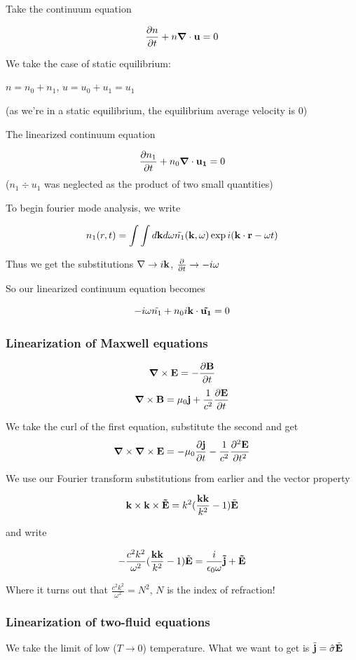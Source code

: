 \documentclass[PlasmaNotes.tex]{subfiles}
\begin{document}
Take the continuum equation

\[\frac{\partial n}{\partial t} + n\mbox{\boldmath$ \nabla $} \cdot \mathbf{u}=0 \]

We take the case of static equilibrium:

$n = n_0 + n_1$, $u = u_0 + u_1 = u_1$

(as we're in a static equilibrium, the equilibrium average velocity is $0$)

The linearized continuum equation

\[\frac{\partial n_1}{\partial t} + n_0\mbox{\boldmath$ \nabla $} \cdot \mathbf{u_1}=0 \]
($n_1 \div{u_1}$ was neglected as the product of two small quantities)

To begin fourier mode analysis, we write

\[ n_1(r, t) = \int{\int{d\ensuremath{\mathbf{k}} d\omega \tilde{n_1}(\ensuremath{\mathbf{k}}, \omega) \exp{i(\ensuremath{\mathbf{k}} \cdot \ensuremath{\mathbf{r}}-\omega t)}}}\]

Thus we get the substitutions $\nabla \rightarrow i \mathbf{k}$, $\frac{\partial }{\partial t} \rightarrow -i\omega$

So our linearized continuum equation becomes

\[-i\omega \tilde{n_1} + n_0 i \mathbf{k} \cdot \mathbf{\tilde{u_1}} = 0\]


\subsubsection{Linearization of Maxwell equations}
\[\mbox{\boldmath$ \nabla $} \times \mathbf{E} = -\frac{\partial \mathbf{B}}{\partial t}\]
\[\mbox{\boldmath$ \nabla $} \times \mathbf{B} = \mu_0 \mathbf{j} + \frac{1}{c^2} \frac{\partial \mathbf{E}}{\partial t}\]

We take the curl of the first equation, substitute the second and get
\[ \mbox{\boldmath$ \nabla $} \times \mathbf{\mbox{\boldmath$ \nabla $} \times \mathbf{E}} = -\mu_0 \frac{\partial \mathbf{j}}{\partial t} - \frac{1}{c^2} \frac{\partial^2 \mathbf{E}}{\partial t^2} \]

We use our Fourier transform substitutions from earlier and the vector property

\[ \mathbf{k} \times \mathbf{\mathbf{k} \times \mathbf{\tilde{E}}} = k^2 (\frac{\mathbf{k}\mathbf{k}}{k^2} - 1) \tilde{\mathbf{E}} \]

and write

\[ - \frac{c^2 k^2}{\omega^2} (\frac{\mathbf{k}\mathbf{k}}{k^2} - 1) \tilde{\mathbf{E}} = \frac{i}{\epsilon_0 \omega} \mathbf{\tilde{j}} + \mathbf{\tilde{E}} \]

Where it turns out that $\frac{c^2 k^2}{\omega^2} = N^2$, $N$ is the index of refraction!

\subsubsection{Linearization of two-fluid equations}

We take the limit of low ($T\rightarrow 0$) temperature. What we want to get is $\tilde{\mathbf{j}} = \hat{\sigma} \tilde{\mathbf{E}}$
\end{document}

